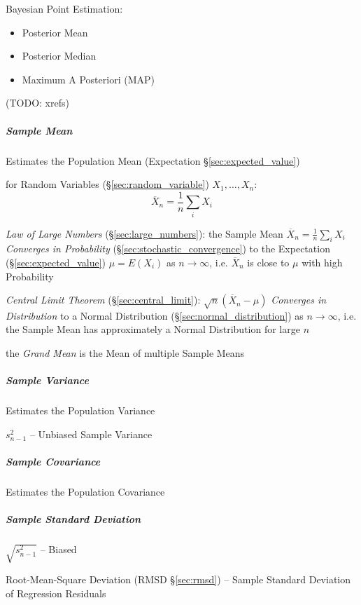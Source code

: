 Bayesian Point Estimation:
\begin{itemize}
  \item Posterior Mean
  \item Posterior Median
  \item Maximum A Posteriori (MAP)
\end{itemize}

(TODO: xrefs)



\subparagraph{Sample Mean}\label{sec:sample_mean}

Estimates the Population Mean (Expectation \S\ref{sec:expected_value})

for Random Variables (\S\ref{sec:random_variable}) $X_1, \ldots, X_n$:
\[
  \overline{X}_n = \frac{1}{n}\sum_i X_i
\]

\emph{Law of Large Numbers} (\S\ref{sec:large_numbers}): the Sample Mean
$\overline{X}_n = \frac{1}{n}\sum_i X_i$ \emph{Converges in Probability}
(\S\ref{sec:stochastic_convergence}) to the Expectation
(\S\ref{sec:expected_value}) $\mu = E(X_i)$ as $n \rightarrow \infty$, i.e.
$\overline{X}_n$ is close to $\mu$ with high Probability

\emph{Central Limit Theorem} (\S\ref{sec:central_limit}):
$\sqrt{n}(\overline{X}_n - \mu)$ \emph{Converges in Distribution} to a Normal
Distribution (\S\ref{sec:normal_distribution}) as $n \rightarrow \infty$, i.e.
the Sample Mean has approximately a Normal Distribution for large $n$

the \emph{Grand Mean} is the Mean of multiple Sample Means



\subparagraph{Sample Variance}\label{sec:sample_variance}\hfill

Estimates the Population Variance

$s^2_{n-1}$ -- Unbiased Sample Variance



\subparagraph{Sample Covariance}\label{sec:sample_covariance}\hfill

Estimates the Population Covariance



\subparagraph{Sample Standard Deviation}
\label{sec:sample_standard_deviation}\hfill

$\sqrt{s^2_{n-1}}$ -- Biased

\fist Root-Mean-Square Deviation (RMSD \S\ref{sec:rmsd}) -- Sample Standard
Deviation of Regression Residuals



